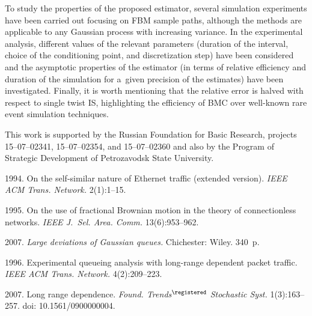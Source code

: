 \begin{multicols}{2}
To study the properties of the proposed estimator, several simulation experiments 
have been  carried out focusing on FBM sample paths, although the methods are
applicable to any Gaussian process with increasing variance. In the experimental 
analysis,  different values of the relevant parameters (duration of 
the interval, choice of the conditioning point, and discretization step) have
been considered and 
 the asymptotic properties of the estimator (in terms of relative 
efficiency and duration of the simulation for a~given precision of the estimates)
have been investigated. 
Finally, it is worth mentioning that the relative error is halved with respect to 
single twist IS, highlighting the efficiency of BMC over well-known rare event 
simulation techniques.

\vspace*{-6pt}

\Ack  
\noindent
This work is supported by the Russian Foundation for Basic
Research, projects 15--07--02341, 15--07--02354, and 15--07--02360 and also 
 by the Program of Strategic Development of Petrozavodsk State University.
 
 
\renewcommand{\bibname}{\protect\rmfamily References}

\vspace*{-6pt}


{\small\frenchspacing
{\baselineskip=10.65pt
\begin{thebibliography}{99}
 1994. 
On the self-similar nature of Ethernet traffic (extended version). 
\textit{IEEE ACM Trans. Network.} 2(1):1--15.

 1995. On the use of fractional Brownian motion in the theory of
  connectionless networks. \textit{IEEE J.~Sel. Area. Comm.} 
  13(6):953--962.

 2007. \textit{Large deviations of Gaussian queues.}
Chichester: Wiley. 340~p.



  1996. Experimental 
 queueing analysis with long-range dependent packet traffic. 
 \textit{IEEE ACM Trans. Network.} 4(2):209--223.

 2007. Long range dependence. 
\textit{Found. Trends$^\registered$ Stochastic Syst.} 1(3):163--257. doi: 10.1561/0900000004.


\end{thebibliography}}}
\end{multicols}
